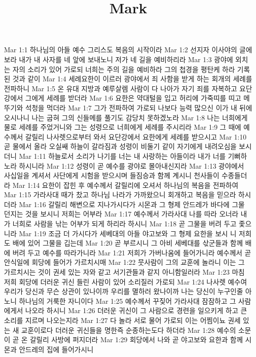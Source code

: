 

\title{Mark}

Mar 1:1  하나님의 아들 예수 그리스도 복음의 시작이라
Mar 1:2  선지자 이사야의 글에 보라 내가 내 사자를 네 앞에 보내노니 저가 네 길을 예비하리라
Mar 1:3  광야에 외치는 자의 소리가 있어 가로되 너희는 주의 길을 예비하라 그의 첩경을 평탄케 하라 기록된 것과 같이
Mar 1:4  세례요한이 이르러 광야에서 죄 사함을 받게 하는 회개의 세례를 전파하니
Mar 1:5  온 유대 지방과 예루살렘 사람이 다 나아가 자기 죄를 자복하고 요단강에서 그에게 세례를 받더라
Mar 1:6  요한은 약대털을 입고 허리에 가죽띠를 띠고 메뚜기와 석청을 먹더라
Mar 1:7  그가 전파하여 가로되 나보다 능력 많으신 이가 내 뒤에 오시나니 나는 굽혀 그의 신들메를 풀기도 감당치 못하겠노라
Mar 1:8  나는 너희에게 물로 세례를 주었거니와 그는 성령으로 너희에게 세례를 주시리라
Mar 1:9  그 때에 예수께서 갈릴리 나사렛으로부터 와서 요단강에서 요한에게 세례를 받으시고
Mar 1:10  곧 물에서 올라 오실쌔 하늘이 갈라짐과 성령이 비둘기 같이 자기에게 내려오심을 보시더니
Mar 1:11  하늘로서 소리가 나기를 너는 내 사랑하는 아들이라 내가 너를 기뻐하노라 하시니라
Mar 1:12  성령이 곧 예수를 광야로 몰아내신지라
Mar 1:13  광야에서 사십일을 계셔서 사단에게 시험을 받으시며 들짐승과 함께 계시니 천사들이 수종들더라
Mar 1:14  요한이 잡힌 후 예수께서 갈릴리에 오셔서 하나님의 복음을 전파하여
Mar 1:15  가라사대 때가 찼고 하나님 나라가 가까왔으니 회개하고 복음을 믿으라 하시더라
Mar 1:16  갈릴리 해변으로 지나가시다가 시몬과 그 형제 안드레가 바다에 그물 던지는 것을 보시니 저희는 어부라
Mar 1:17  예수께서 가라사대 나를 따라 오너라 내가 너희로 사람을 낚는 어부가 되게 하리라 하시니
Mar 1:18  곧 그물을 버려 두고 좇으니라
Mar 1:19  조금 더 가시다가 세베대의 아들 야고보와 그 형제 요한을 보시 니 저희도 배에 있어 그물을 깁는데
Mar 1:20  곧 부르시니 그 아비 세베대를 삯군들과 함께 배에 버려 두고 예수를 따라가니라
Mar 1:21  저희가 가버나움에 들어가니라 예수께서 곧 안식일에 회당에 들어가 가르치시매
Mar 1:22  뭇사람이 그의 교훈에 놀라니 이는 그 가르치시는 것이 권세 있는 자와 같고 서기관들과 같지 아니함일러라
Mar 1:23  마침 저희 회당에 더러운 귀신 들린 사람이 있어 소리질러 가로되
Mar 1:24  나사렛 예수여 우리가 당신과 무슨 상관이 있나이까 우리를 멸하러 왔나이까 나는 당신이 누구인줄 아노니 하나님의 거룩한 자니이다
Mar 1:25  예수께서 꾸짖어 가라사대 잠잠하고 그 사람에게서 나오라 하시니
Mar 1:26  더러운 귀신이 그 사람으로 경련을 일으키게 하고 큰 소리를 지르며 나오는지라
Mar 1:27  다 놀라 서로 물어 가로되 이는 어찜이뇨 권세 있는 새 교훈이로다 더러운 귀신들을 명한즉 순종하는도다 하더라
Mar 1:28  예수의 소문이 곧 온 갈릴리 사방에 퍼지더라
Mar 1:29  회당에서 나와 곧 야고보와 요한과 함께 시몬과 안드레의 집에 들어가시니
